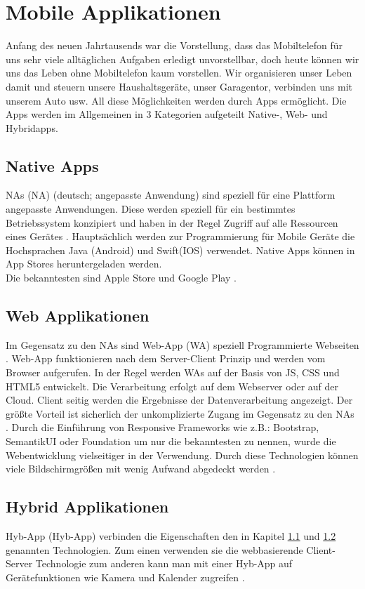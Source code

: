 \section{Mobile Applikationen}
Anfang des neuen Jahrtausends war die Vorstellung, dass das Mobiltelefon für uns sehr viele alltäglichen Aufgaben erledigt unvorstellbar, doch heute können wir uns das Leben ohne 
Mobiltelefon kaum vorstellen.
Wir organisieren unser Leben damit und steuern unsere Haushaltsgeräte, unser Garagentor, verbinden uns mit unserem Auto usw. All diese Möglichkeiten werden durch Apps ermöglicht.
Die Apps werden im Allgemeinen in 3 Kategorien aufgeteilt
Native-, Web- und Hybridapps. 

\subsection{Native Apps}\label{chap:Native Apps}
\acl{NA}s (NA) (deutsch; angepasste Anwendung) sind speziell für eine Plattform angepasste Anwendungen. 
Diese werden speziell für ein bestimmtes Betriebssystem konzipiert und haben in der Regel Zugriff auf alle Ressourcen eines Gerätes \cite{NativeApp}.
Hauptsächlich werden zur Programmierung für Mobile Geräte die Hochsprachen Java (Android) und Swift(IOS) verwendet. Native Apps können in App Stores heruntergeladen  werden. \\Die bekanntesten sind Apple Store und Google Play \cite{Hochsprachen}.

\subsection{Web Applikationen}\label{chap:Webapplikationen}
Im Gegensatz zu den \acs{NA}s sind \acl{Web-App} (\acs{WA}) speziell Programmierte Webseiten \cite{Hochsprachen}.
\acs{Web-App} funktionieren nach dem Server-Client Prinzip und werden vom Browser aufgerufen. In der Regel werden \acs{WA}s auf der Basis von \acs{JS}, \acs{CSS} und \acs{HTML5} entwickelt. Die Verarbeitung erfolgt auf dem Webserver oder auf der Cloud. 
Client seitig werden die Ergebnisse der Datenverarbeitung angezeigt. Der größte Vorteil ist sicherlich der unkomplizierte Zugang im Gegensatz zu den \acs{NA}s \cite{WebApps}.
Durch die Einführung von Responsive Frameworks wie z.B.: Bootstrap, SemantikUI oder Foundation um nur die bekanntesten zu nennen, wurde die Webentwicklung vielseitiger in der Verwendung. Durch diese Technologien können viele Bildschirmgrößen mit wenig Aufwand abgedeckt werden \cite{CSS}. 

\subsection{Hybrid Applikationen}
\acl{Hyb-App} (\acs{Hyb-App}) verbinden die Eigenschaften den in Kapitel \ref{chap:Native Apps} und \ref{chap:Webapplikationen} genannten Technologien. Zum einen verwenden sie die webbasierende Client-Server Technologie zum anderen kann man mit einer \acs{Hyb-App} auf Gerätefunktionen wie Kamera und Kalender zugreifen \cite{HybridApps}. 

